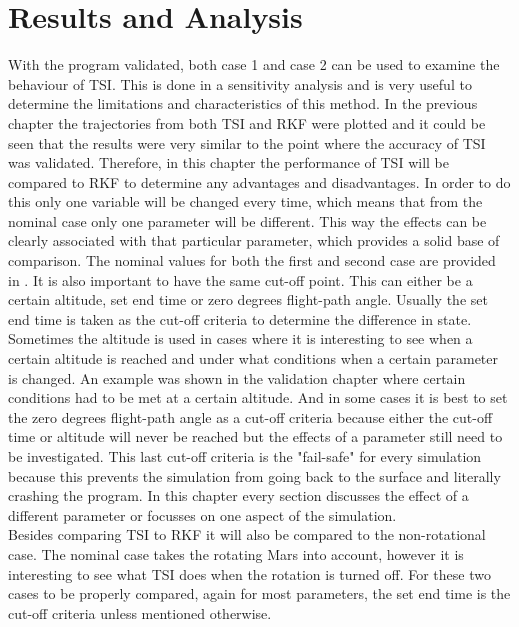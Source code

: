 \chapter{Results and Analysis} 
\label{ch:results}
With the program validated, both case 1 and case 2 can be used to examine the behaviour of \ac{TSI}. This is done in a sensitivity analysis and is very useful to determine the limitations and characteristics of this method. In the previous chapter the trajectories from both \ac{TSI} and \ac{RKF} were plotted and it could be seen that the results were very similar to the point where the accuracy of \ac{TSI} was validated. Therefore, in this chapter the performance of \ac{TSI} will be compared to \ac{RKF} to determine any advantages and disadvantages. In order to do this only one variable will be changed every time, which means that from the nominal case only one parameter will be different. This way the effects can be clearly associated with that particular parameter, which provides a solid base of comparison. The nominal values for both the first and second case are provided in . It is also important to have the same cut-off point. This can either be a certain altitude, set end time or zero degrees flight-path angle. Usually the set end time is taken as the cut-off criteria to determine the difference in state. Sometimes the altitude is used in cases where it is interesting to see when a certain altitude is reached and under what conditions when a certain parameter is changed. An example was shown in the validation chapter where certain conditions had to be met at a certain altitude. And in some cases it is best to set the zero degrees flight-path angle as a cut-off criteria because either the cut-off time or altitude will never be reached but the effects of a parameter still need to be investigated. This last cut-off criteria is the "fail-safe" for every simulation because this prevents the simulation from going back to the surface and literally crashing the program. In this chapter every section discusses the effect of a different parameter or focusses on one aspect of the simulation. \\

Besides comparing \ac{TSI} to \ac{RKF} it will also be compared to the non-rotational case. The nominal case takes the rotating Mars into account, however it is interesting to see what \ac{TSI} does when the rotation is turned off. For these two cases to be properly compared, again for most parameters, the set end time is the cut-off criteria unless mentioned otherwise.\\

